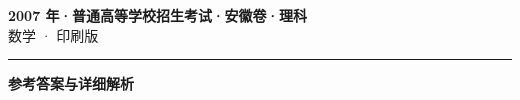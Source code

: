 \documentclass[zihao=5, a4paper]{ctexart}
\begin{document}
\begin{center}
  {\Large\bfseries 2007 年·普通高等学校招生考试·安徽卷·理科}\\[4pt]
  {\large 数学 · 印刷版}
\end{center}
\medskip
{}

\par\bigskip\hrule\bigskip
{}
\begin{center}{\large\bfseries 参考答案与详细解析}\end{center}
\smallskip

\end{document}
